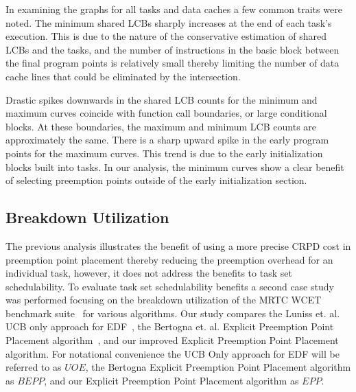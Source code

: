 In examining the graphs for all tasks and data caches a few common traits were noted. The minimum shared LCBs sharply increases at the end of each task's execution. This is due to the nature of the conservative estimation of shared LCBs and the tasks, and the number of instructions in the basic block between the final program points is relatively small thereby limiting the number of data cache lines that could be eliminated by the intersection.
%

Drastic spikes downwards in the shared LCB counts for the minimum and maximum curves coincide with function call boundaries, or large conditional blocks. At these boundaries, the maximum and minimum LCB counts are approximately the same. There is a sharp upward spike in the early program points for the maximum curves. This trend is due to the early initialization blocks built into tasks. In our analysis, the minimum curves show a clear benefit of selecting preemption points outside of the early initialization section.
\vspace{-10pt}
\subsection{Breakdown Utilization}
The previous analysis illustrates the benefit of using a more precise CRPD cost in preemption point placement thereby reducing the preemption overhead
for an individual task, however, it does not address the benefits to task set schedulability. To evaluate task set schedulability benefits a second case study was performed focusing on the breakdown utilization of the MRTC WCET benchmark suite~\cite{mrtc:01} for various algorithms.  Our study compares the Luniss et. al. UCB only approach for EDF~\cite{lunniss:13}, the Bertogna et. al. Explicit Preemption Point Placement algorithm~\cite{bertogna:11}, and our improved Explicit Preemption Point Placement algorithm. For notational convenience the UCB Only approach for EDF will be referred to as ${UOE}$, the Bertogna Explicit Preemption Point Placement algorithm as ${BEPP}$, and our Explicit Preemption Point Placement algorithm as ${EPP}$.

